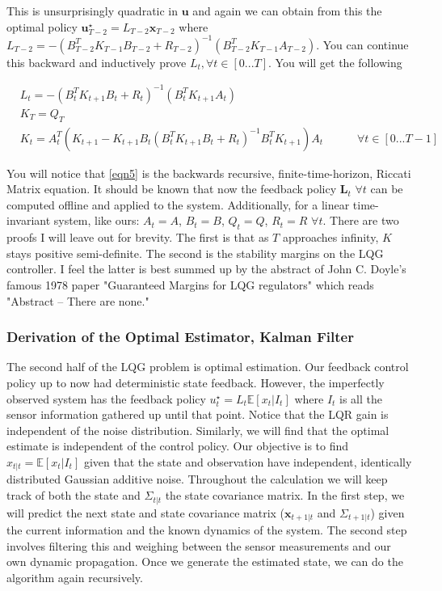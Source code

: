 \documentclass[conf]{new-aiaa}
\begin{document}
\begin{doublespace}
This is unsurprisingly quadratic in $\mathbf{u}$ and again we can obtain from this the optimal policy $\mathbf{u}_{T-2}^\star = L_{T-2}\mathbf{x}_{T-2}$ where $L_{T-2} = -(B_{T-2}^TK_{T-1}B_{T-2} + R_{T-2})^{-1}(B_{T-2}^TK_{T-1}A_{T-2})$. You can continue this backward and inductively prove $L_t, \forall t \in [0 ... T]$. You will get the following
\begin{singlespace}
\begin{align}
& L_{t} = -(B_{t}^TK_{t+1}B_{t} + R_{t})^{-1}(B_{t}^TK_{t+1}A_{t}) \\
& K_T = Q_T\\
& K_t = A_{t}^T (K_{t+1} - K_{t+1}B_{t}(B_{t}^TK_{t+1}B_{t} + R_{t})^{-1}B_{t}^TK_{t+1})A_{t}  \quad \quad \quad \forall t \in [0 ... T-1] \label{eqn5}
\end{align}
\end{singlespace}

You will notice that \ref{eqn5} is the backwards recursive, finite-time-horizon, Riccati Matrix equation. It should be known that now the feedback policy $\mathbf{L}_t$ $\forall t$ can be computed offline and applied to the system. Additionally, for a linear time-invariant system, like ours: $A_t = A$, $B_t = B$, $Q_t = Q$, $R_t = R$ $\forall t$. There are two proofs I will leave out for brevity. The first is that as $T$ approaches infinity, $K$ stays positive semi-definite. The second is the stability margins on the LQG controller. I feel the latter is best summed up by the abstract of John C. Doyle's famous 1978 paper "Guaranteed Margins for LQG regulators" which reads "Abstract -- There are none."

\subsubsection{Derivation of the Optimal Estimator, Kalman Filter}
The second half of the LQG problem is optimal estimation. Our feedback control policy up to now had deterministic state feedback. However, the imperfectly observed system has the feedback policy $u_t^\star = L_t\mathbb{E}[x_t|I_t]$ where $I_t$ is all the sensor information gathered up until that point. Notice that the LQR gain is independent of the noise distribution. Similarly, we will find that the optimal estimate is independent of the control policy. Our objective is to find $x_{t|t}=\mathbb{E}[x_t|I_t]$ given that the state and observation have independent, identically distributed Gaussian additive noise. Throughout the calculation we will keep track of both the state and $\Sigma_{t|t}$ the state covariance matrix. In the first step, we will predict the next state and state covariance matrix ($\mathbf{x}_{t+1|t}$ and $\Sigma_{t+1|t}$) given the current information and the known dynamics of the system. The second step involves filtering this and weighing between the sensor measurements and our own dynamic propagation. Once we generate the estimated state, we can do the algorithm again recursively.


\end{doublespace}
\end{document}
